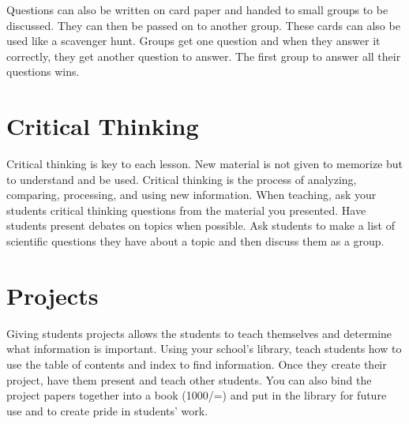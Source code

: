 Questions can also be written on card paper and handed to small groups to be discussed. They can then be passed on to another group.  These cards can also be used like a scavenger hunt.  Groups get one question and when they answer it correctly, they get another question to answer.  The first group to answer all their questions wins.

\section{Critical Thinking}
Critical thinking is key to each lesson.  New material is not given to memorize but to understand and be used. Critical thinking is the process of analyzing, comparing, processing, and using new information. When teaching, ask your students critical thinking questions from the material you presented.  Have students present debates on topics when possible.  Ask students to make a list of scientific questions they have about a topic and then discuss them as a group.

\section{Projects}
Giving students projects allows the students to teach themselves and determine what information is important. Using your school's library, teach students how to use the table of contents and index to find information. Once they create their project, have them present and teach other students. You can also bind the project papers together into a book (1000/=) and put in the library for future use and to create pride in students' work.
